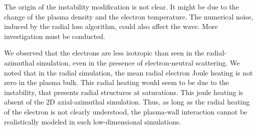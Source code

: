 The origin of the instability modification is not clear.
It might be due to the change of the plasma density and the electron temperature.
The numerical noise, induced by the radial loss algorithm, could also affect the wave.
More investigation must be conducted.

\vspace{1em}
We observed that the electrons are less isotropic than seen in the radial-azimuthal simulation, even in the presence of electron-neutral scattering.
We noted that in the radial simulation, the mean radial electron Joule heating is not zero in the plasma bulk.
This radial heating would seem to be due to the instability, that presents radial structures at saturations.
This joule heating is absent of the \ac{2D} axial-azimuthal simulation.
Thus, as long as the radial heating of the electron is not clearly understood, the plasma-wall interaction cannot be realistically modeled in such low-dimensional simulations.

